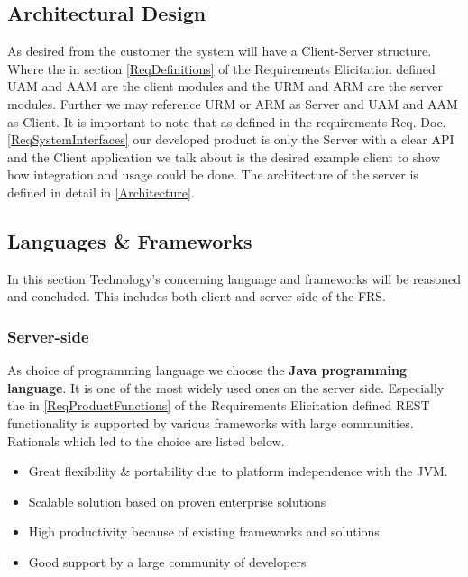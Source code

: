 \documentclass[a4paper,11pt]{article}
\begin{document}
\subsection{Architectural Design} 
As desired from the customer the system will have a Client-Server structure. Where the in section \ref{ReqDefinitions} of the Requirements Elicitation defined UAM and AAM are the client modules and the URM and ARM are the server modules. Further we may reference URM or ARM as Server and UAM and AAM as Client. It is important to note that as defined in the requirements Req. Doc. \ref{ReqSystemInterfaces} our developed product is only the Server with a clear API and the Client application we talk about is the desired example client to show how integration and usage could be done.
The architecture of the server is defined in detail in \ref{Architecture}.

\subsection{Languages \& Frameworks}
In this section Technology's concerning language and frameworks will be reasoned and concluded. This includes both client and server side of the FRS.
\subsubsection{Server-side}
As choice of programming language we choose the \textbf{Java programming language}. It is one of the most widely used ones on the server side. Especially the  in \ref{ReqProductFunctions} of the Requirements Elicitation defined REST functionality is supported by various frameworks with large communities. Rationals which led to the choice are listed below.
\begin{itemize}
\item Great flexibility \& portability due to platform independence with the JVM.
\item Scalable solution based on proven enterprise solutions
\item High productivity because of existing frameworks and solutions
\item Good support by a large community of developers
\end{itemize}
\end{document}
